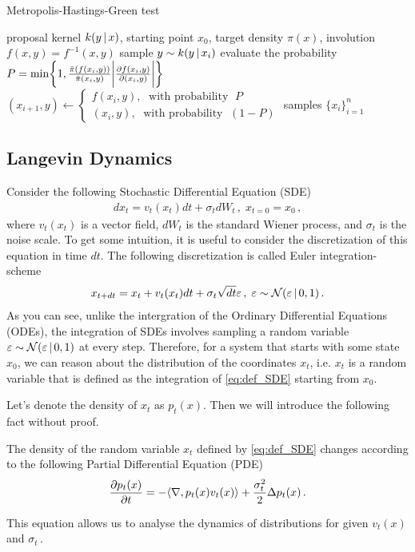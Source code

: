 \begin{algorithm}[t]
\caption{Metropolis-Hastings-Green test}\label{alg:mhg}
\begin{algorithmic}
\REQUIRE proposal kernel $k(y\,|\, x)$, starting point $x_0$, target density $\pi(x)$, involution $f(x,y) = f^{-1}(x,y)$
\FOR{iterations $i \in [0,n)$}
\STATE sample $y \sim k(y\,|\, x_i)$
\STATE evaluate the probability $P = \min\left\{1,\frac{\bar{\pi}(f(x_i, y))}{\bar{\pi}(x_i,y)}\bigg|\deriv{f(x_i,y)}{(x_i,y)}\bigg|\right\}$
\STATE $(x_{i+1},y) \gets \begin{cases} f(x_i, y), \;\text{ with probability }\; P\\
        (x_i,y), \;\text{ with probability }\; (1-P)\end{cases}$
\ENDFOR
\RETURN samples $\{x_i\}_{i=1}^n$
\end{algorithmic}
\end{algorithm}

\subsection{Langevin Dynamics}

Consider the following Stochastic Differential Equation (SDE)
\begin{align}
    dx_t = v_t(x_t)dt + \sigma_t dW_t\,,\; x_{t=0} = x_0\,,
    \label{eq:def_SDE}
\end{align}
where $v_t(x_t)$ is a vector field, $dW_t$ is the standard Wiener process, and $\sigma_t$ is the noise scale. To get some intuition, it is useful to consider the discretization of this equation in time $dt$. The following discretization is called Euler integration-scheme
\begin{align}
    x_{t+dt} = x_t + v_t(x_t)dt + \sigma_t \sqrt{dt}\varepsilon\,,\; \varepsilon \sim \mathcal{N}(\varepsilon\,|\, 0,1)\,.
\end{align}
As you can see, unlike the intergration of the Ordinary Differential Equations (ODEs), the integration of SDEs involves sampling a random variable $\varepsilon \sim \mathcal{N}(\varepsilon\,|\, 0,1)$ at every step. Therefore, for a system that starts with some state $x_0$, we can reason about the distribution of the coordinates $x_t$, i.e. $x_t$ is a random variable that is defined as the integration of \cref{eq:def_SDE} starting from $x_0$.

Let's denote the density of $x_t$ as $p_t(x)$. Then we will introduce the following fact without proof.
\begin{theorem}
    The density of the random variable $x_t$ defined by \cref{eq:def_SDE} changes according to the following Partial Differential Equation (PDE)
    \begin{align}
        \deriv{p_t(x)}{t} = -\inner{\nabla}{p_t(x)v_t(x)} + \frac{\sigma_t^2}{2}\Delta p_t(x)\,.
    \end{align}
\end{theorem}
This equation allows us to analyse the dynamics of distributions for given $v_t(x)$ and $\sigma_t$\,.

